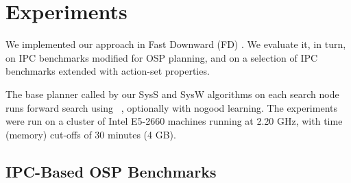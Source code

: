 

\newcommand{\scatterplotsize}{8cm}
\newcommand{\scatterplotxlabelshift}{1.5ex}
\newcommand{\scatterplotylabelshift}{-3ex}




\section{Experiments}
\label{experiments}


We implemented our approach in Fast Downward
(FD) \cite{helmert:jair-06}. We evaluate it, in turn, on IPC
benchmarks modified for OSP planning, and on a selection of IPC
benchmarks extended with action-set properties.

The base planner called by our SysS and SysW algorithms on each search
node runs forward search using
\hff\ \cite{hoffmann:nebel:jair-01}, optionally 
with nogood learning.
%
%
The experiments were run on a cluster of Intel E5-2660 machines
running at 2.20 GHz, with time (memory) cut-offs of 30 minutes (4
GB).



 
\subsection{IPC-Based OSP Benchmarks}

%

